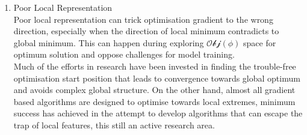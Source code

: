 \begin{enumerate}
    \item Poor Local Representation \\
Poor local representation can trick optimisation gradient to the wrong direction, especially when the direction of local minimum contradicts to global minimum. This can happen during exploring $\mathcal{Obj}(\phi)$ space for optimum solution and oppose challenges for model training. \\
Much of the efforts in research have been invested in finding the trouble-free optimisation start position that leads to convergence towards global optimum and avoids complex global structure. On the other hand, almost all gradient based algorithms are designed to optimise towards local extremes, minimum success has achieved in the attempt to develop algorithms that can escape the trap of local features, this still an active research area. \\
\end{enumerate}

